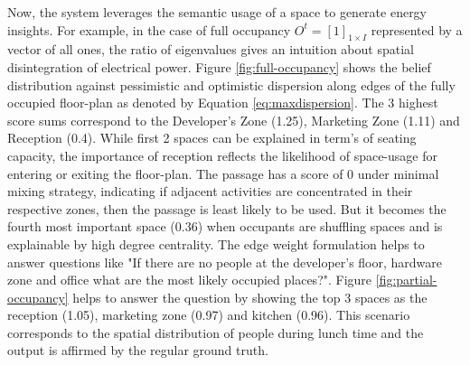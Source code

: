 \documentclass[conference]{IEEEtran}
\begin{document}
Now, the system leverages the semantic usage of a space to generate energy insights. For example, in the case of full occupancy $O^t=[1]_{1\times I}$ represented by a vector of all ones, the ratio of eigenvalues gives an intuition about spatial disintegration of electrical power. Figure \ref{fig:full-occupancy} shows the belief distribution against pessimistic and optimistic dispersion along edges of the fully occupied floor-plan as denoted by Equation \ref{eq:maxdispersion}. The 3 highest score sums correspond to  the Developer's Zone (1.25), Marketing Zone (1.11) and Reception (0.4). While first 2 spaces can be explained in term's of seating capacity, the importance of reception reflects the likelihood of space-usage for entering or exiting the floor-plan. The passage has a score of 0 under minimal mixing strategy, indicating if adjacent activities are concentrated in their respective zones, then the passage is least likely to be used. But it becomes the fourth most important space (0.36) when occupants are shuffling spaces and is explainable by high degree centrality. The edge weight formulation helps to answer questions like "If there are no people at the developer's floor, hardware zone and office what are the most likely occupied places?". Figure \ref{fig:partial-occupancy} helps to answer the question by showing the top 3 spaces as the reception (1.05), marketing zone (0.97) and kitchen (0.96). This scenario corresponds to the spatial distribution of people during lunch time and the output is affirmed by the regular ground truth. 




 


\end{document}
